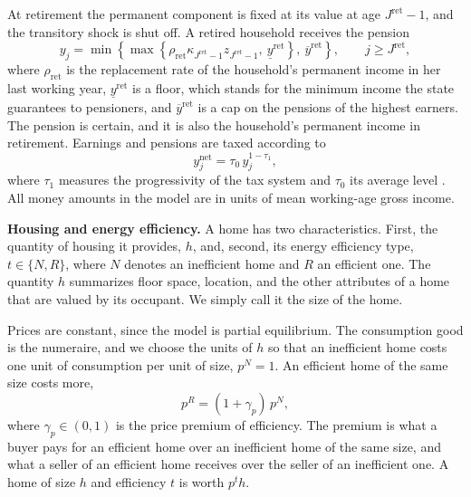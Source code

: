 At retirement the permanent component is fixed at its value at age
$J^{\mathrm{ret}}-1$, and the transitory shock is shut off. A retired
household receives the pension
\begin{equation}
  y_j=\min\left\{\max\left\{\rho_{\mathrm{ret}}\kappa_{J^{\mathrm{ret}}-1}z_{J^{\mathrm{ret}}-1},\
    \underline y^{\mathrm{ret}}\right\},\ \overline y^{\mathrm{ret}}\right\},
  \qquad j\geq J^{\mathrm{ret}},
  \label{eq:pension}
\end{equation}
where $\rho_{\mathrm{ret}}$ is the replacement rate of the household's
permanent income in her last working year, $\underline y^{\mathrm{ret}}$
is a floor, which stands for the minimum income the state guarantees to
pensioners, and $\overline y^{\mathrm{ret}}$ is a cap on the pensions of
the highest earners. The pension is certain, and it is also the household's
permanent income in retirement. Earnings and pensions are taxed according
to
\begin{equation}
  y^{\mathrm{net}}_j=\tau_0\,y_j^{1-\tau_1},
  \label{eq:tax}
\end{equation}
where $\tau_1$ measures the progressivity of the tax system and $\tau_0$
its average level \citep{heathcote2017progressivity}. All money amounts in
the model are in units of mean working-age gross income.



\noindent\textbf{Housing and energy efficiency.}
A home has two characteristics. First,  the quantity of housing it provides, $h$,
and, second,  its energy efficiency type, $t\in\{N,R\}$, where $N$ denotes an inefficient
home and $R$ an efficient one. The quantity $h$ summarizes floor space,
location, and the other attributes of a home that are valued by its
occupant. We simply call it the size of the home.

Prices are constant, since the model is partial equilibrium. The
consumption good is the numeraire, and we choose the units of $h$ so that
an inefficient home costs one unit of consumption per unit of size,
$p^N=1$. An efficient home of the same size costs more,
\begin{equation}
  p^R=(1+\gamma_p)\,p^N,
  \label{eq:price-premium}
\end{equation}
where $\gamma_p \in (0,1)$ is the price premium of efficiency.  The premium is what a buyer pays for an
efficient home over an inefficient home of the same size, and what a seller
of an efficient home receives over the seller of an inefficient one. A home of size $h$
and efficiency $t$ is worth $p^th$.



